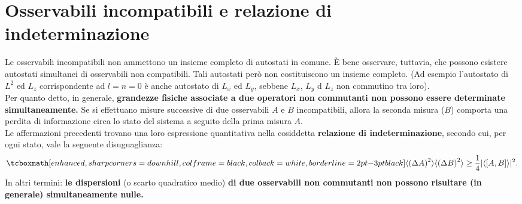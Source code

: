 \documentclass[a4paper,12pt,oneside]{book}
\begin{document}
\section[Osservabili incompatibili e relazione di indeterminazione]{Osservabili incompatibili e relazione di\\ indeterminazione}
Le osservabili incompatibili non ammettono un insieme completo di autostati in comune. È bene osservare, tuttavia, che possono esistere autostati simultanei di osservabili non compatibili. Tali autostati però non costituiscono un insieme completo. (Ad esempio l'autostato di $L^2$ ed $L_z$ corrispondente ad $l=n=0$ è anche autostato di $L_x$ ed $L_y$, sebbene $L_x$, $L_y$ d $L_z$ non commutino tra loro).\\

Per quanto detto, in generale, \textbf{grandezze fisiche associate a due operatori non commutanti non possono essere determinate simultaneamente.} Se si effettuano misure successive di due osservabili $A$ e $B$ incompatibili, allora la seconda misura ($B$) comporta una perdita di informazione circa lo stato del sistema a seguito della prima misura $A$.\\

Le affermazioni precedenti trovano una loro espressione quantitativa nella cosiddetta \textbf{relazione di indeterminazione}, secondo cui, per ogni stato, vale la seguente disuguaglianza:
	\begin{equation}
		\label{eq:cap4_2}
		\tcboxmath[enhanced, sharp corners=downhill, colframe=black, colback=white, borderline={2pt}{-3pt}{black}]{
			\langle \left( \Delta A \right) ^2 \rangle \langle \left( \Delta B \right) ^2 \rangle \geq\frac{1}{4}\vert \langle \left[A,B \right] \rangle \vert ^2.
			}
	\end{equation}
In altri termini: \textbf{le dispersioni} (o scarto quadratico medio) \textbf{di due osservabili non commutanti non possono risultare (in generale) simultaneamente nulle.}\\
\end{document}
